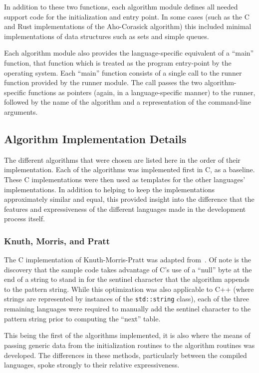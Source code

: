 In addition to these two functions, each algorithm module defines all needed support code for the initialization and entry point. In some cases (such as the C and Rust implementations of the Aho-Corasick algorithm) this included minimal implementations of data structures such as sets and simple queues.

Each algorithm module also provides the language-specific equivalent of a ``main'' function, that function which is treated as the program entry-point by the operating system. Each ``main'' function consists of a single call to the runner function provided by the runner module. The call passes the two algorithm-specific functions as pointers (again, in a language-specific manner) to the runner, followed by the name of the algorithm and a representation of the command-line arguments.

\subsection{Algorithm Implementation Details}

The different algorithms that were chosen are listed here in the order of their implementation. Each of the algorithms was implemented first in C, as a baseline. These C implementations were then used as templates for the other languages' implementations. In addition to helping to keep the implementations approximately similar and equal, this provided insight into the difference that the features and expressiveness of the different languages made in the development process itself.

\subsubsection{Knuth, Morris, and Pratt}

The C implementation of Knuth-Morris-Pratt was adapted from~\cite[Chapter 7]{handbook.2004}. Of note is the discovery that the sample code takes advantage of C's use of a ``null'' byte at the end of a string to stand in for the sentinel character that the algorithm appends to the pattern string. While this optimization was also applicable to C++ (where strings are represented by instances of the \texttt{std::string} class), each of the three remaining languages were required to manually add the sentinel character to the pattern string prior to computing the ``next'' table.

This being the first of the algorithms implemented, it is also where the means of passing generic data from the initialization routines to the algorithm routines was developed. The differences in these methods, particularly between the compiled languages, spoke strongly to their relative expressiveness.

